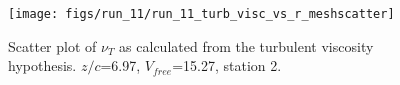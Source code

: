 \begin{figure}[H]
\centering
\texttt{[image: figs/run\_11/run\_11\_turb\_visc\_vs\_r\_meshscatter]}
\caption{Scatter plot of $\nu_T$ as calculated from the turbulent viscosity hypothesis. $z/c$=6.97, $V_{free}$=15.27, station 2.}
\label{fig:run_11_turb_visc_vs_r_meshscatter}
\end{figure}


